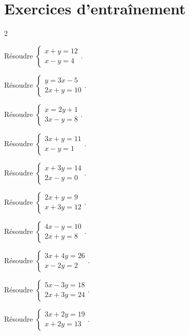 \section{Exercices d'entraînement}
\begin{multicols}{2}

\exo{} Résoudre $\left\{\begin{array}{l}x+y=12\\x-y=4\end{array}\right.$.

\exo{} Résoudre $\left\{\begin{array}{l}y=3x-5\\2x+y=10\end{array}\right.$.

\exo{} Résoudre $\left\{\begin{array}{l}x=2y+1\\3x-y=8\end{array}\right.$.

\exo{} Résoudre $\left\{\begin{array}{l}3x+y=11\\x-y=1\end{array}\right.$.

\exo{} Résoudre $\left\{\begin{array}{l}x+3y=14\\2x-y=0\end{array}\right.$.

\exo{} Résoudre $\left\{\begin{array}{l}2x+y=9\\x+3y=12\end{array}\right.$.

\exo{} Résoudre $\left\{\begin{array}{l}4x-y=10\\2x+y=8\end{array}\right.$.

\exo{} Résoudre $\left\{\begin{array}{l}3x+4y=26\\x-2y=2\end{array}\right.$.

\exo{} Résoudre $\left\{\begin{array}{l}5x-3y=18\\2x+3y=24\end{array}\right.$.

\exo{} Résoudre $\left\{\begin{array}{l}3x+2y=19\\x+2y=13\end{array}\right.$.


\end{multicols}
